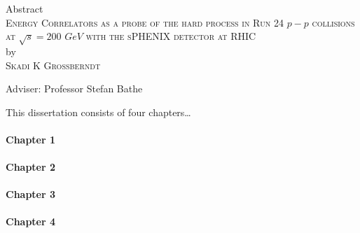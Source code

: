 \begin{center}
Abstract \\
\textsc{Energy Correlators as a probe of the hard process in Run 24 $p-p$ collisions at $\sqrt{s}=200$ $GeV$ with the sPHENIX detector at RHIC} \\
by \\
\textsc{Skadi K Grossberndt} \\[0.25in]
\end{center}

\vspace{0.25in}

\noindent Adviser: Professor Stefan Bathe

\vspace{0.25in}

\noindent This dissertation consists of four chapters\ldots

\paragraph{Chapter 1} %

\paragraph{Chapter 2} %

\paragraph{Chapter 3} %

\paragraph{Chapter 4} %
